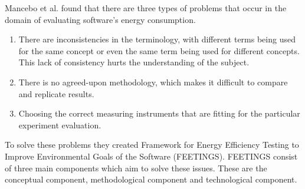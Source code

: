 







Mancebo et al.\cite{GarciaFEETINGS}  found that there are three types of problems that occur in the domain of evaluating software's energy consumption.\cite{GarciaFEETINGS} 
\begin{enumerate}
    \item There are inconsistencies in the terminology, with different terms being used for the same concept or even the same term being used for different concepts. This lack of consistency hurts the understanding of the subject.
    \item There is no agreed-upon methodology, which makes it difficult to compare and replicate results.
    \item Choosing the correct measuring instruments that are fitting for the particular experiment evaluation.
\end{enumerate}

To solve these problems they created Framework for Energy Efficiency Testing to Improve Environmental Goals of the Software (FEETINGS). FEETINGS consist of three main components which aim to solve these issues. These are the conceptual component, methodological component and technological component.\cite{GarciaFEETINGS}\nytafsnit

